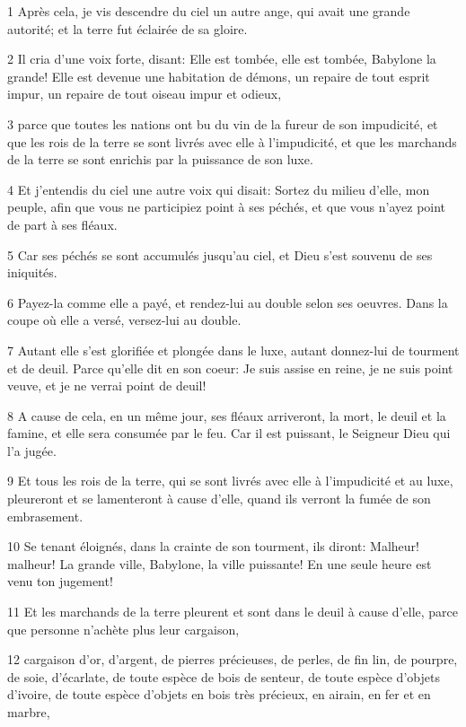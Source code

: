 \par 1 Après cela, je vis descendre du ciel un autre ange, qui avait une grande autorité; et la terre fut éclairée de sa gloire.
\par 2 Il cria d'une voix forte, disant: Elle est tombée, elle est tombée, Babylone la grande! Elle est devenue une habitation de démons, un repaire de tout esprit impur, un repaire de tout oiseau impur et odieux,
\par 3 parce que toutes les nations ont bu du vin de la fureur de son impudicité, et que les rois de la terre se sont livrés avec elle à l'impudicité, et que les marchands de la terre se sont enrichis par la puissance de son luxe.
\par 4 Et j'entendis du ciel une autre voix qui disait: Sortez du milieu d'elle, mon peuple, afin que vous ne participiez point à ses péchés, et que vous n'ayez point de part à ses fléaux.
\par 5 Car ses péchés se sont accumulés jusqu'au ciel, et Dieu s'est souvenu de ses iniquités.
\par 6 Payez-la comme elle a payé, et rendez-lui au double selon ses oeuvres. Dans la coupe où elle a versé, versez-lui au double.
\par 7 Autant elle s'est glorifiée et plongée dans le luxe, autant donnez-lui de tourment et de deuil. Parce qu'elle dit en son coeur: Je suis assise en reine, je ne suis point veuve, et je ne verrai point de deuil!
\par 8 A cause de cela, en un même jour, ses fléaux arriveront, la mort, le deuil et la famine, et elle sera consumée par le feu. Car il est puissant, le Seigneur Dieu qui l'a jugée.
\par 9 Et tous les rois de la terre, qui se sont livrés avec elle à l'impudicité et au luxe, pleureront et se lamenteront à cause d'elle, quand ils verront la fumée de son embrasement.
\par 10 Se tenant éloignés, dans la crainte de son tourment, ils diront: Malheur! malheur! La grande ville, Babylone, la ville puissante! En une seule heure est venu ton jugement!
\par 11 Et les marchands de la terre pleurent et sont dans le deuil à cause d'elle, parce que personne n'achète plus leur cargaison,
\par 12 cargaison d'or, d'argent, de pierres précieuses, de perles, de fin lin, de pourpre, de soie, d'écarlate, de toute espèce de bois de senteur, de toute espèce d'objets d'ivoire, de toute espèce d'objets en bois très précieux, en airain, en fer et en marbre,
